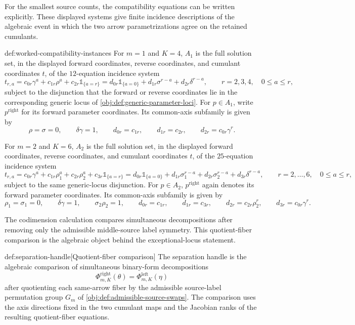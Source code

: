 \documentclass[11pt]{article}
\begin{document}
For the smallest source counts, the compatibility equations can be written explicitly. These displayed systems give finite incidence descriptions of the algebraic event in which the two arrow parametrizations agree on the retained cumulants.

\begin{definitionv}{def:worked-compatibility-instances}
For \(m=1\) and \(K=4\), \(A_1\) is the full solution set, in the displayed forward coordinates, reverse coordinates, and cumulant coordinates \(t\), of the \(12\)-equation incidence system
\[
t_{r,a}
=
c_{0r}\gamma^a+c_{1r}\rho^a+c_{2r}\mathbb 1_{\{a=r\}}
=
d_{0r}\mathbb 1_{\{a=0\}}+d_{1r}\sigma^{r-a}+d_{2r}\delta^{r-a},
\qquad
r=2,3,4,\quad 0\leq a\leq r,
\]
subject to the disjunction that the forward or reverse coordinates lie in the corresponding generic locus of \cref{obj:def:generic-parameter-loci}. For \(p\in A_1\), write \(p^{\mathrm{right}}\) for its forward parameter coordinates. Its common-axis subfamily is given by
\[
\rho=\sigma=0,\qquad
\delta\gamma=1,\qquad
d_{0r}=c_{1r},\qquad
d_{1r}=c_{2r},\qquad
d_{2r}=c_{0r}\gamma^r.
\]

For \(m=2\) and \(K=6\), \(A_2\) is the full solution set, in the displayed forward coordinates, reverse coordinates, and cumulant coordinates \(t\), of the \(25\)-equation incidence system
\[
t_{r,a}
=
c_{0r}\gamma^a+c_{1r}\rho_1^a+c_{2r}\rho_2^a+c_{3r}\mathbb 1_{\{a=r\}}
=
d_{0r}\mathbb 1_{\{a=0\}}+d_{1r}\sigma_1^{r-a}+d_{2r}\sigma_2^{r-a}+d_{3r}\delta^{r-a},
\qquad
r=2,\ldots,6,\quad 0\leq a\leq r,
\]
subject to the same generic-locus disjunction. For \(p\in A_2\), \(p^{\mathrm{right}}\) again denotes its forward parameter coordinates. Its common-axis subfamily is given by
\[
\rho_1=\sigma_1=0,\qquad
\delta\gamma=1,\qquad
\sigma_2\rho_2=1,\qquad
d_{0r}=c_{1r},\qquad
d_{1r}=c_{3r},\qquad
d_{2r}=c_{2r}\rho_2^r,\qquad
d_{3r}=c_{0r}\gamma^r.
\]
\end{definitionv}

The codimension calculation compares simultaneous decompositions after removing only the admissible middle-source label symmetry. This quotient-fiber comparison is the algebraic object behind the exceptional-locus statement.

\begin{definitionv}{def:separation-handle}[Quotient-fiber comparison]
The separation handle is the algebraic comparison of simultaneous binary-form decompositions
\[
\Phi^{\mathrm{right}}_{m,K}(\theta)=\Phi^{\mathrm{left}}_{m,K}(\eta)
\]
after quotienting each same-arrow fiber by the admissible source-label permutation group \(G_m\) of \cref{obj:def:admissible-source-swaps}.  The comparison uses the axis directions fixed in the two cumulant maps and the Jacobian ranks of the resulting quotient-fiber equations.
\end{definitionv}
\end{document}

